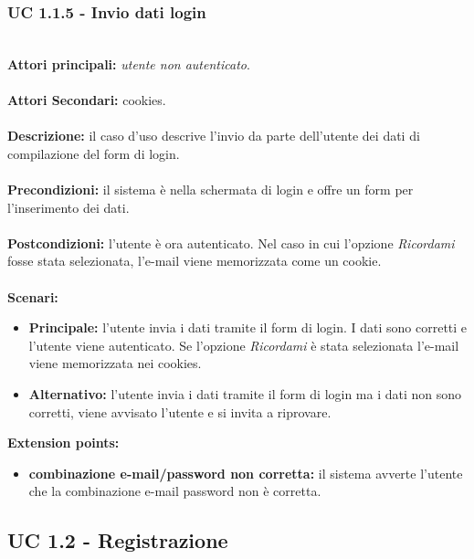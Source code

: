 \documentclass[a4paper,11pt]{article}
\begin{document}
\subsubsection{UC 1.1.5 - Invio dati login}
\ \\
\textbf{Attori principali:} \textit{utente non autenticato}.\\
\\
\textbf{Attori Secondari:} cookies.\\
\\
\textbf{Descrizione:} il caso d'uso descrive l'invio da parte dell'utente dei dati di compilazione del form di login. \\
\\
\textbf{Precondizioni:} il sistema è nella schermata di login e offre un form per l'inserimento dei dati.\\
\\
\textbf{Postcondizioni:} l'utente è ora autenticato. Nel caso in cui l'opzione \textit{Ricordami} fosse stata selezionata, l'e-mail viene memorizzata come un cookie. \\
\\
\textbf{Scenari:}
\begin{itemize}
\item \textbf{Principale:} l'utente invia i dati tramite il form di login. I dati sono corretti e l'utente viene autenticato. Se l'opzione \textit{Ricordami} è stata selezionata l'e-mail viene memorizzata nei cookies.
\item \textbf{Alternativo:} l'utente invia i dati tramite il form di login ma i dati non sono corretti, viene avvisato l'utente e si invita a riprovare.
\end{itemize}
\textbf{Extension points:}
\begin{itemize}
\item \textbf{combinazione e-mail/password non corretta:} il sistema avverte l'utente che la combinazione e-mail password non è corretta. 

\end{itemize}

\newpage

\subsection{UC 1.2 - Registrazione}
\end{document}
